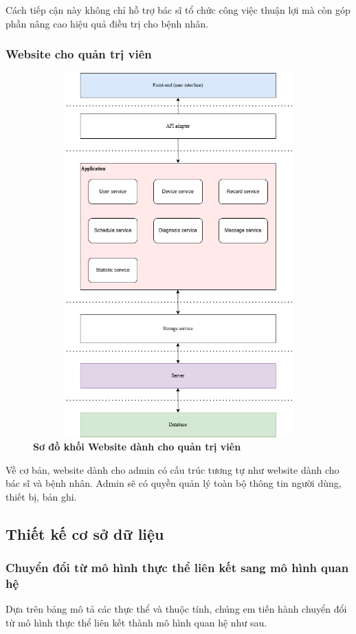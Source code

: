 Cách tiếp cận này không chỉ hỗ trợ bác sĩ tổ chức công việc thuận lợi mà còn góp phần nâng cao hiệu quả điều trị cho bệnh nhân.

\subsubsection{Website cho quản trị viên}
\begin{figure}[H]
  \centering
  \includegraphics[width=12cm,height=14cm]{Images/System/fmECG_architecture-Admin.drawio.png}
  \caption[Sơ đồ khối Website dành cho quản trị viên]{\bfseries \fontsize{12pt}{0pt}\selectfont Sơ đồ khối Website dành cho quản trị viên}
  \label{fmECG_architecture-Admin} %
\end{figure}
Về cơ bản, website dành cho admin có cấu trúc tương tự như website dành cho bác sĩ và bệnh nhân.
Admin sẽ có quyền quản lý toàn bộ thông tin người dùng, thiết bị, bản ghi.

\subsection{Thiết kế cơ sở dữ liệu}

\subsubsection{Chuyển đổi từ mô hình thực thể liên kết sang mô hình quan hệ}
Dựa trên bảng mô tả các thực thể và thuộc tính, chúng em tiến hành chuyển đổi từ mô hình thực thể liên kết thành mô hình quan hệ như sau.

